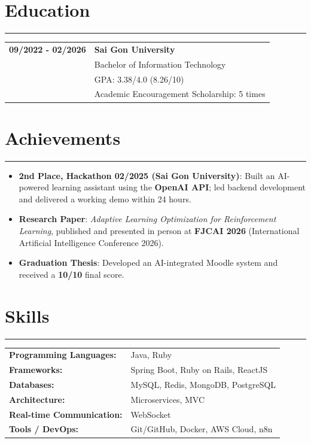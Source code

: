 \documentclass[a4paper,10pt]{article}
\renewcommand{\arraystretch}{1.2}
\begin{document}
\section{Education}
\vspace{-10pt}
\noindent\rule{\linewidth}{0.5pt}
\begin{tabularx}{\linewidth}{l X}
    \textbf{09/2022 - 02/2026} & \textbf{Sai Gon University} \\
    & Bachelor of Information Technology \\
    & GPA: 3.38/4.0 (8.26/10) \\
    & Academic Encouragement Scholarship: 5 times
\end{tabularx}

\section{Achievements}
\vspace{-8pt}
\noindent\rule{\linewidth}{0.5pt}
\begin{itemize}
    \item \textbf{2nd Place, Hackathon 02/2025 (Sai Gon University)}: Built an AI-powered learning assistant using the \textbf{OpenAI API}; led backend development and delivered a working demo within 24 hours.
    \item \textbf{Research Paper}: \textit{Adaptive Learning Optimization for Reinforcement Learning}, published and presented in person at \textbf{FJCAI 2026} (International Artificial Intelligence Conference 2026).
    \item \textbf{Graduation Thesis}: Developed an AI-integrated Moodle system and received a \textbf{10/10} final score.
\end{itemize}

\section{Skills}
\vspace{-10pt}
\noindent\rule{\linewidth}{0.5pt}
\renewcommand{\arraystretch}{1.1}
\begin{tabularx}{\linewidth}{l X}
    \textbf{Programming Languages:} & Java, Ruby \\
    \textbf{Frameworks:} & Spring Boot, Ruby on Rails, ReactJS \\
    \textbf{Databases:} & MySQL, Redis, MongoDB, PostgreSQL \\
    \textbf{Architecture:} & Microservices, MVC \\
    \textbf{Real-time Communication:} & WebSocket \\
    \textbf{Tools / DevOps:} & Git/GitHub, Docker, AWS Cloud, n8n
\end{tabularx}
\end{document}
